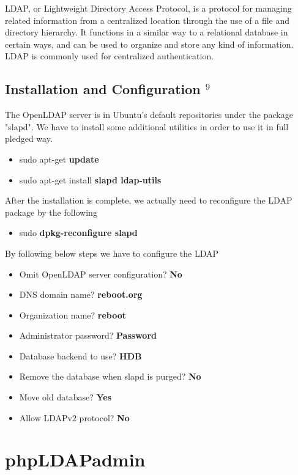 \documentclass[12pt]{report}
\begin{document}
	LDAP, or Lightweight Directory Access Protocol, is a protocol for managing related information from a centralized location through the use of a file and directory hierarchy. It functions in a similar way to a relational database in certain ways, and can be used to organize and store any kind of information. LDAP is commonly used for centralized authentication.

\subsection{Installation and Configuration $ ^{9}$}
	The OpenLDAP server is in Ubuntu's default repositories under the package "slapd". We have to install some additional utilities in order to use it in full pledged way. 
	
	\begin{itemize}
	\item sudo apt-get \textbf{update}
	\item sudo apt-get install \textbf{slapd ldap-utils}
	\end{itemize}

	After the installation is complete, we actually need to reconfigure the LDAP package by the following
	\begin{itemize}
	\item sudo \textbf{dpkg-reconfigure slapd}
	\end{itemize}

		By following below steps we have to configure the LDAP
	\begin{itemize}
		\item Omit OpenLDAP server configuration? \textbf{No}
		\item DNS domain name? \textbf{reboot.org}
		\item Organization name? \textbf{reboot}
		\item Administrator password? \textbf{Password}
		\item Database backend to use? \textbf{HDB}
		\item Remove the database when slapd is purged? \textbf{No}
		\item Move old database? \textbf{Yes}
		\item Allow LDAPv2 protocol? \textbf{No}
	\end{itemize}
	
\pagebreak
	
\section{phpLDAPadmin}	
	
\end{document}
